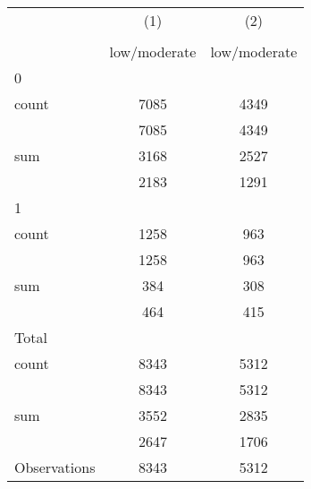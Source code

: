 {
\def\sym#1{\ifmmode^{#1}\else\(^{#1}\)\fi}
\begin{tabular}{l*{2}{c}}
\hline\hline
                    &\multicolumn{1}{c}{(1)}&\multicolumn{1}{c}{(2)}\\
                    &\multicolumn{1}{c}{}&\multicolumn{1}{c}{}\\
                    &low/moderate&low/moderate\\
\hline
0                   &            &            \\
count               &        7085&        4349\\
                    &        7085&        4349\\
sum                 &        3168&        2527\\
                    &        2183&        1291\\
\hline
1                   &            &            \\
count               &        1258&         963\\
                    &        1258&         963\\
sum                 &         384&         308\\
                    &         464&         415\\
\hline
Total               &            &            \\
count               &        8343&        5312\\
                    &        8343&        5312\\
sum                 &        3552&        2835\\
                    &        2647&        1706\\
\hline
Observations        &        8343&        5312\\
\hline\hline
\end{tabular}
}
